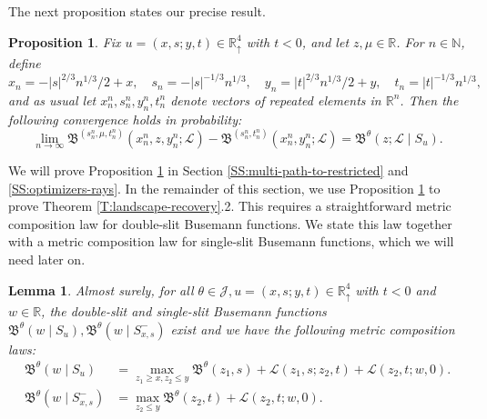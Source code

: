 \documentclass[11pt]{article}
\newcommand{\N}{\mathbb{N}}
\newcommand{\R}{\mathbb{R}}
\newcommand{\Rd}{\mathbb{R}^4_\uparrow}
\newcommand{\cJ}{\mathcal{J}}
\newcommand{\cL}{\mathcal{L}}
\newtheorem{lemma}[theorem]{Lemma}
\newtheorem{proposition}[theorem]{Proposition}
\theoremstyle{definition} %
\theoremstyle{remark} %
\begin{document}
 The next proposition states our precise result.

\begin{proposition}
	\label{P:double-slit-reconstruction}
	Fix $u = (x, s; y, t) \in \Rd$ with $t < 0$, and let $z, \mu \in \R$. For $n \in \N$, define
	$$
	x_n = -|s|^{2/3} n^{1/3}/2 + x, \quad s_n = -|s|^{-1/3} n^{1/3}, \quad y_n = |t|^{2/3} n^{1/3}/2 + y, \quad t_n = |t|^{-1/3} n^{1/3},
	$$
	and as usual let $x_n^n, s_n^n, y_n^n, t_n^n$ denote vectors of repeated elements in $\R^n$. Then the following convergence holds in probability:
	\begin{equation}
		\label{E:lim-ninfty}
		\lim_{n \to \infty} \mathfrak B^{(s_n^n, \mu, t_n^n)}(x_n^n, z, y_n^n ; \cL) - \mathfrak B^{(s_n^n, t_n^n)}(x_n^n, y_n^n ; \cL) = \mathfrak B^\theta(z ; \cL \mid S_u).
	\end{equation}
\end{proposition}

We will prove Proposition \ref{P:double-slit-reconstruction} in Section \ref{SS:multi-path-to-restricted} and \ref{SS:optimizers-rays}. In the remainder of this section, we use Proposition \ref{P:double-slit-reconstruction} to prove Theorem \ref{T:landscape-recovery}.2. This requires a straightforward metric composition law for double-slit Busemann functions. We state this law together with a metric composition law for single-slit Busemann functions, which we will need later on.
\begin{lemma}
	\label{L:metric-comp}
Almost surely, for all $\theta \in \cJ, u = (x, s; y, t) \in \Rd$ with $t < 0$ and $w \in \R$, the double-slit and single-slit Busemann functions $\mathfrak B^\theta(w \mid S_u), \mathfrak B^\theta(w \mid S_{x, s}^-)$ exist and we have the following metric composition laws:
	\begin{align}
		\label{E:mc-Buse}
		\mathfrak B^\theta(w \mid S_u) &= \max_{z_1 \ge x, z_2 \le y} \mathfrak B^\theta(z_1, s) + \cL(z_1, s; z_2, t) + \cL(z_2, t; w, 0). \\
		\label{E:mc-Buse-single}
		\mathfrak B^\theta(w \mid S_{x, s}^-) &= \max_{z_2 \le y} \mathfrak B^\theta(z_2, t) + \cL(z_2, t; w, 0).
	\end{align}
\end{lemma}
\end{document}

